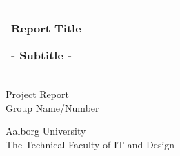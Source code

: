 %
%
%
%
%
\begin{titlepage}
  \addtolength{\hoffset}{0.5\evensidemargin-0.5\oddsidemargin} %
  \noindent%
  \begin{tabular}{@{}p{\textwidth}@{}}
    \toprule[2pt]
    \midrule
    \vspace{0.2cm}
    \begin{center}
    \Huge{\textbf{
      Report Title%
    }}
    \end{center}
    \begin{center}
      \Large{
        - Subtitle -%
      }
    \end{center}
    \vspace{0.2cm}\\
    \midrule
    \toprule[2pt]
  \end{tabular}
  \vspace{4 cm}
  \begin{center}
    {\large
      Project Report%
    }\\
    \vspace{0.2cm}
    {\Large
      Group Name/Number%
    }
  \end{center}
  \vfill
  \begin{center}
  Aalborg University\\
  The Technical Faculty of IT and Design
  \end{center}
\end{titlepage}
\clearpage
